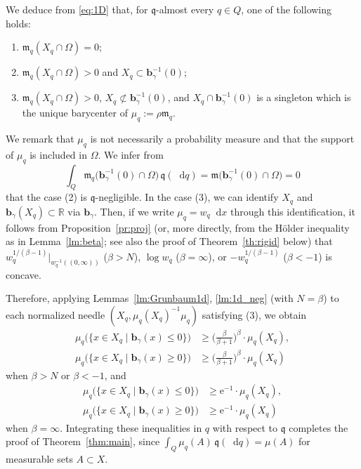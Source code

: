 \documentclass[sts]{imsart}
\theoremstyle{definition}
\theoremstyle{remark}
\newcommand{\R}{\mathbb{R}}
\newcommand{\bb}{\mathbf{b}}
\newcommand{\fm}{\mathfrak{m}}
\newcommand{\fq}{\mathfrak{q}}
\newcommand{\e}{\mathrm{e}}
\newcommand*\diff{\mathop{}\!\mathrm{d}}
\begin{document}
We deduce from \eqref{eq:1D} that, for $\fq$-almost every $q \in Q$, one of the following holds:
\begin{enumerate}[(1)]
\item $\fm_q(X_q \cap \Omega) =0$;
\item $\fm_q(X_q \cap \Omega) >0$ and $X_q \subset \bb_{\gamma}^{-1}(0)$;
\item $\fm_q(X_q \cap \Omega) >0$, $X_q \not\subset \bb_{\gamma}^{-1}(0)$,
and $X_q \cap \bb_{\gamma}^{-1}(0)$ is a singleton which is the unique barycenter of $\mu_q:=\rho \fm_q$.
\end{enumerate}
We remark that $\mu_q$ is not necessarily a probability measure and that the support of $\mu_q$ is included in $\Omega$.
We infer from
\[
\int_Q \fm_q \bigl( \bb_{\gamma}^{-1}(0) \cap \Omega \bigr) \,\fq(\diff q)
=\fm \bigl( \bb_{\gamma}^{-1}(0) \cap \Omega \bigr)=0
\]
that the case (2) is $\fq$-negligible.
In the case (3), we can identify $X_q$ and $\bb_{\gamma}(X_q) \subset \R$ via $\bb_{\gamma}$.
Then, if we write $\mu_q =w_q \diff x$ through this identification, it follows from Proposition~\ref{pr:proj} (or, more directly, from the H\"older inequality as in Lemma~\ref{lm:beta}; see also the proof of Theorem~\ref{th:rigid} below) that $w_q^{1/(\beta -1)}|_{w_q^{-1}((0,\infty))}$ ($\beta>N$), $\log w_q$ ($\beta=\infty$), or $-w_q^{1/(\beta -1)}$ ($\beta<-1$) is concave.

Therefore, applying Lemmas~\ref{lm:Grunbaum1d}, \ref{lm:1d_neg} (with $N=\beta$) to each normalized needle $(X_q,\mu_q(X_q)^{-1} \mu_q)$ satisfying (3), we obtain
\begin{align}
\mu_q \bigl( \{ x \in X_q \mid \bb_{\gamma}(x) \le 0 \} \bigr)
&\ge \biggl( \frac{\beta}{\beta +1} \biggr)^\beta \cdot \mu_q(X_q), \label{eq:mu_q<}\\
\mu_q \bigl( \{ x \in X_q \mid \bb_{\gamma}(x) \ge 0 \} \bigr)
&\ge \biggl( \frac{\beta}{\beta +1} \biggr)^\beta \cdot \mu_q(X_q) \nonumber
\end{align}
when $\beta>N$ or $\beta<-1$, and
\begin{align*}
\mu_q \bigl( \{ x \in X_q \mid \bb_{\gamma}(x) \le 0 \} \bigr)
&\ge \e^{-1} \cdot \mu_q(X_q), \\
\mu_q \bigl( \{ x \in X_q \mid \bb_{\gamma}(x) \ge 0 \} \bigr)
&\ge \e^{-1} \cdot \mu_q(X_q)
\end{align*}
when $\beta=\infty$.
Integrating these inequalities in $q$ with respect to $\fq$ completes the proof of Theorem~\ref{thm:main}, 
since $\int_Q \mu_q(A) \,\fq(\diff q) =\mu(A)$ for measurable sets $A \subset X$.
\end{document}

